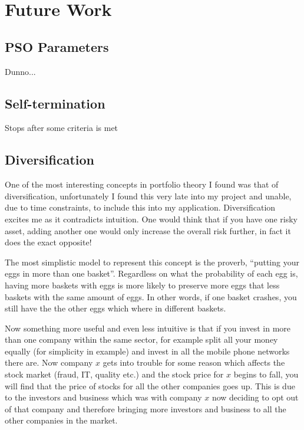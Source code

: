 \documentclass{pdfmx4020}
\begin{document}

\chapter{Future Work}

  \section{PSO Parameters} %
  \label{sec:parameters}
    Dunno...

  \section{Self-termination} %
  \label{sec:self_termination}
    Stops after some criteria is met

  \section{Diversification} %
  \label{sec:diversification}
    One of the most interesting concepts in portfolio theory I found was that of diversification, unfortunately I found this very late into my project and unable, due to time constraints, to include this into my application. Diversification excites me as it contradicts intuition. One would think that if you have one risky asset, adding another one would only increase the overall risk further, in fact it does the exact opposite!

    The most simplistic model to represent this concept is the proverb, ``putting your eggs in more than one basket''. Regardless on what the probability of each egg is, having more baskets with eggs is more likely to preserve more eggs that less baskets with the same amount of eggs. In other words, if one basket crashes, you still have the the other eggs which where in different baskets. 

    Now something more useful and even less intuitive is that if you invest in more than one company within the same sector, for example split all your money equally (for simplicity in example) and invest in all the mobile phone networks there are. Now company $x$ gets into trouble for some reason which affects the stock market (fraud, IT, quality etc.) and the stock price for $x$ begins to fall, you will find that the price of stocks for all the other companies goes up. This is due to the investors and business which was with company $x$ now deciding to opt out of that company and therefore bringing more investors and business to all the other companies in the market. 
\end{document}

